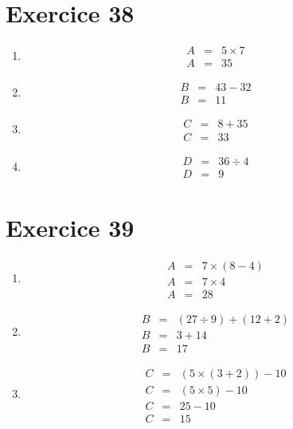 \documentclass[12pt,a4paper]{extarticle}
\begin{document}
\section*{Exercice 38}

\begin{multicols}{4}
	\begin{enumerate}[label=\alph*.]
	\item \begin{eqnarray*}
		A &=& 5 \times 7 \\
		A &=& 35
	\end{eqnarray*}

	\item \begin{eqnarray*}
		B &=& 43 - 32 \\
		B &=& 11
	\end{eqnarray*}

	\item \begin{eqnarray*}
		C &=& 8 + 35 \\
		C &=& 33
	\end{eqnarray*}

	\item \begin{eqnarray*}
		D &=& 36 \div 4 \\
		D &=& 9
	\end{eqnarray*}
\end{enumerate}
\end{multicols}

\section*{Exercice 39}
	\begin{multicols}{3}
		\begin{enumerate}[label=\alph*.]
			
		\item \begin{eqnarray*}
			A &=& 7 \times (8 - 4) \\
			A &=& 7 \times 4 \\
			A &=& 28
		\end{eqnarray*}
		
		\item \begin{eqnarray*}
			B &=& (27 \div 9) + (12 + 2)\\
			B &=& 3 + 14\\
			B &=& 17
		\end{eqnarray*}
		
		\item \begin{eqnarray*}
			C &=& (5 \times (3 + 2)) - 10 \\
			C &=& (5 \times 5) - 10 \\
			C &=& 25 - 10 \\
			C &=& 15
		\end{eqnarray*}
		
	\end{enumerate}
	\end{multicols}
\end{document}
